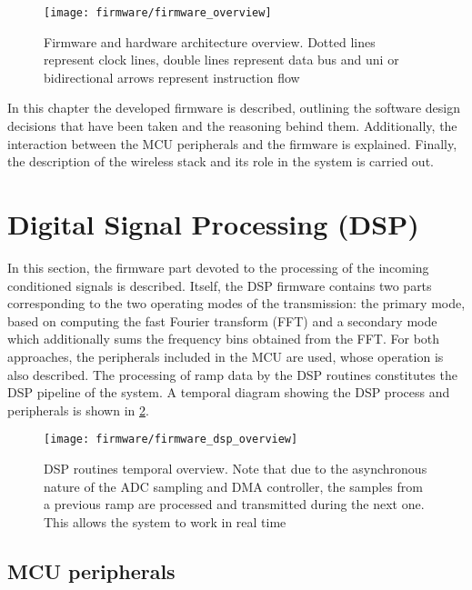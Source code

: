 \begin{figure}[ht]
	\centering
	\texttt{[image: firmware/firmware\_overview]}
	\caption{Firmware and hardware architecture overview. Dotted lines represent clock lines, double lines represent data bus and uni or bidirectional arrows represent instruction flow}
	\label{fig:firmware_overview}
\end{figure}

In this chapter the developed firmware is described, outlining the software design decisions that have been taken and the reasoning behind them. Additionally, the interaction between the MCU peripherals and the firmware is explained. Finally, the description of the wireless stack and its role in the system is carried out.

\section{Digital Signal Processing (DSP)}

In this section, the firmware part devoted to the processing of the incoming conditioned signals is described. Itself, the DSP firmware contains two parts corresponding to the two operating modes of the transmission: the primary mode, based on computing the fast Fourier transform (FFT) and a secondary mode which additionally sums the frequency bins obtained from the FFT. For both approaches, the peripherals included in the MCU are used, whose operation is also described. The processing of ramp data by the DSP routines constitutes the DSP pipeline of the system. A temporal diagram showing the DSP process and peripherals is shown in \cref{fig:firmware_dsp_overview}.

\begin{figure}[ht]
	\centering
	\texttt{[image: firmware/firmware\_dsp\_overview]}
	\caption{DSP routines temporal overview. Note that due to the asynchronous nature of the ADC sampling and DMA controller, the samples from a previous ramp are processed and transmitted during the next one. This allows the system to work in real time}
	\label{fig:firmware_dsp_overview}
\end{figure}

\subsection{MCU peripherals}

